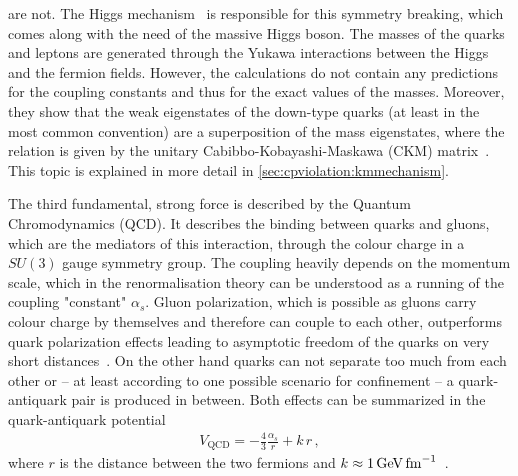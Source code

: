 are not. The Higgs mechanism~\cite{Higgs:1964pj} is responsible for this
symmetry breaking, which comes along with the need of the massive Higgs boson.
The masses of the quarks and leptons are generated through the Yukawa
interactions between the Higgs and the fermion fields. However, the
calculations do not contain any predictions for the coupling constants and
thus for the exact values of the masses. Moreover, they show that the weak
eigenstates of the down-type quarks (at least in the most common convention)
are a superposition of the mass eigenstates, where the relation is given by
the unitary Cabibbo-Kobayashi-Maskawa (CKM) matrix~\cite{Kobayashi:1973fv}.
This topic is explained in more detail in \cref{sec:cpviolation:kmmechanism}.


The third fundamental, strong force is described by the Quantum Chromodynamics
(QCD). It describes the binding between quarks and gluons, which are the
mediators of this interaction, through the colour charge in a $SU(3)$ gauge
symmetry group. The coupling heavily depends on the momentum scale, which in
the renormalisation theory can be understood as a running of the coupling
"constant" $\alpha_s$. Gluon polarization, which is possible as gluons carry
colour charge by themselves and therefore can couple to each other,
outperforms quark polarization effects leading to asymptotic freedom of the
quarks on very short
distances~\cite{AsymptoticFreedom_GrossWilczek,AsymptoticFreedom_Politzer}. On
the other hand quarks can not separate too much from each other or -- at least
according to one possible scenario for confinement -- a quark-antiquark pair
is produced in between. Both effects can be summarized in the quark-antiquark
potential
\begin{align}
	V_{\mathrm{QCD}} = - \frac 43 \frac{\alpha_s}{r} + k\,r\,,
\end{align}
where $r$ is the distance between the two fermions and $k \approx
\SI{1}{\GeV\fm^{-1}}$~\cite{Perkins:1982xb}.